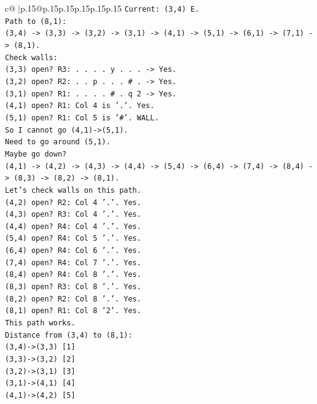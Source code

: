 \documentclass{article}
\begin{document}
{\begin{supertabular}{c@{$\;$}|p{.15\linewidth}@{}p{.15\linewidth}p{.15\linewidth}p{.15\linewidth}p{.15\linewidth}p{.15\linewidth}}
{{{\texttt{Current: (3,4) E.} \\
\texttt{Path to (8,1):} \\
\texttt{(3,4) {-}> (3,3) {-}> (3,2) {-}> (3,1) {-}> (4,1) {-}> (5,1) {-}> (6,1) {-}> (7,1) {-}> (8,1).} \\
\texttt{Check walls:} \\
\texttt{(3,3) open? R3: . . . . y . . . {-}> Yes.} \\
\texttt{(3,2) open? R2: . . p . . . \# . {-}> Yes.} \\
\texttt{(3,1) open? R1: . . . . \# . q 2 {-}> Yes.} \\
\texttt{(4,1) open? R1: Col 4 is '.'. Yes.} \\
\texttt{(5,1) open? R1: Col 5 is '\#'. WALL.} \\
\texttt{So I cannot go (4,1){-}>(5,1).} \\
\texttt{Need to go around (5,1).} \\
\texttt{Maybe go down?} \\
\texttt{(4,1) {-}> (4,2) {-}> (4,3) {-}> (4,4) {-}> (5,4) {-}> (6,4) {-}> (7,4) {-}> (8,4) {-}> (8,3) {-}> (8,2) {-}> (8,1).} \\
\texttt{Let's check walls on this path.} \\
\texttt{(4,2) open? R2: Col 4 '.'. Yes.} \\
\texttt{(4,3) open? R3: Col 4 '.'. Yes.} \\
\texttt{(4,4) open? R4: Col 4 '.'. Yes.} \\
\texttt{(5,4) open? R4: Col 5 '.'. Yes.} \\
\texttt{(6,4) open? R4: Col 6 '.'. Yes.} \\
\texttt{(7,4) open? R4: Col 7 '.'. Yes.} \\
\texttt{(8,4) open? R4: Col 8 '.'. Yes.} \\
\texttt{(8,3) open? R3: Col 8 '.'. Yes.} \\
\texttt{(8,2) open? R2: Col 8 '.'. Yes.} \\
\texttt{(8,1) open? R1: Col 8 '2'. Yes.} \\
\texttt{This path works.} \\
\texttt{Distance from (3,4) to (8,1):} \\
\texttt{(3,4){-}>(3,3) {[}1{]}} \\
\texttt{(3,3){-}>(3,2) {[}2{]}} \\
\texttt{(3,2){-}>(3,1) {[}3{]}} \\
\texttt{(3,1){-}>(4,1) {[}4{]}} \\
\texttt{(4,1){-}>(4,2) {[}5{]}} \\
}}}
\end{supertabular}}
\end{document}
